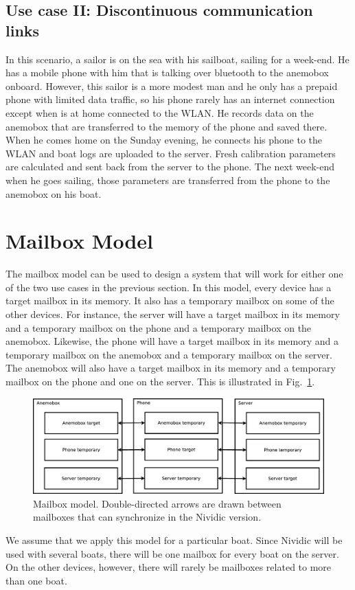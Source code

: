 \documentclass{article}
\begin{document}
\subsection{Use case II: Discontinuous communication links}
\label{sec:hardcase}
In this scenario, a sailor is on the sea with his sailboat, sailing for a week-end. He has a mobile phone with him that is talking over bluetooth to the anemobox onboard. However, this sailor is a more modest man and he only has a prepaid phone with limited data traffic, so his phone rarely has an internet connection except when is at home connected to the WLAN. He records data on the anemobox that are transferred to the memory of the phone and saved there. When he comes home on the Sunday evening, he connects his phone to the WLAN and boat logs are uploaded to the server. Fresh calibration parameters are calculated and sent back from the server to the phone. The next week-end when he goes sailing, those parameters are transferred from the phone to the anemobox on his boat.

\section{Mailbox Model}
The mailbox model can be used to design a system that will work for either one of the two use cases in the previous section. In this model, every device has a target mailbox in its memory. It also has a temporary mailbox on some of the other devices. For instance, the server will have a target mailbox in its memory and a temporary mailbox on the phone and a temporary mailbox on the anemobox. Likewise, the phone will have a target mailbox in its memory and a temporary mailbox on the anemobox and a temporary mailbox on the server. The anemobox will also have a target mailbox in its memory and a temporary mailbox on the phone and one on the server. This is illustrated in Fig.~\ref{fig:mailboxes}.
\begin{figure}
\includegraphics[width=\textwidth]{mailboxes.eps}
\caption{Mailbox model. Double-directed arrows are drawn between mailboxes that can synchronize in the Nividic version.}
\label{fig:mailboxes}
\end{figure}
We assume that we apply this model for a particular boat. Since Nividic will be used with several boats, there will be one mailbox for every boat on the server. On the other devices, however, there will rarely be mailboxes related to more than one boat.
\end{document}
